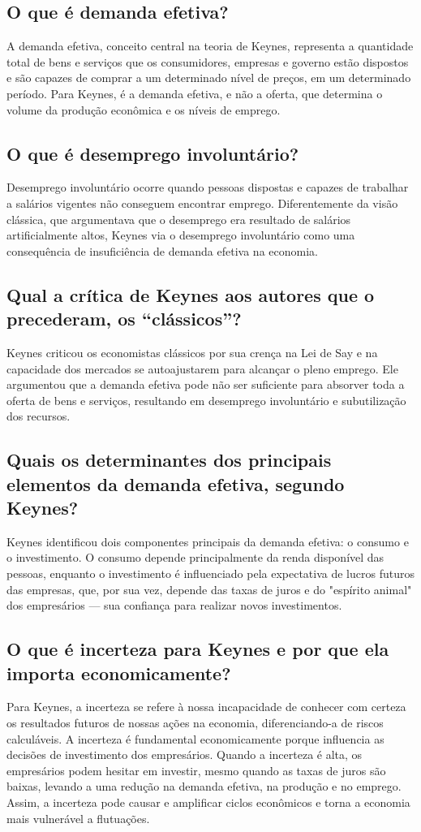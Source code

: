 \documentclass[a4paper,12pt]{article}[abntex2]
\begin{document}
\subsection{\textbf{O que é demanda efetiva?}}
A demanda efetiva, conceito central na teoria de Keynes, representa a quantidade total de bens e serviços que os consumidores, empresas e governo estão dispostos e são capazes de comprar a um determinado nível de preços, em um determinado período. Para Keynes, é a demanda efetiva, e não a oferta, que determina o volume da produção econômica e os níveis de emprego.
\subsection{\textbf{O que é desemprego involuntário?}}
Desemprego involuntário ocorre quando pessoas dispostas e capazes de trabalhar a salários vigentes não conseguem encontrar emprego. Diferentemente da visão clássica, que argumentava que o desemprego era resultado de salários artificialmente altos, Keynes via o desemprego involuntário como uma consequência de insuficiência de demanda efetiva na economia.
\subsection{\textbf{Qual a crítica de Keynes aos autores que o precederam, os “clássicos”?}}
Keynes criticou os economistas clássicos por sua crença na Lei de Say e na capacidade dos mercados se autoajustarem para alcançar o pleno emprego. Ele argumentou que a demanda efetiva pode não ser suficiente para absorver toda a oferta de bens e serviços, resultando em desemprego involuntário e subutilização dos recursos.
\subsection{\textbf{Quais os determinantes dos principais elementos da demanda efetiva, segundo Keynes?}}
Keynes identificou dois componentes principais da demanda efetiva: o consumo e o investimento. O consumo depende principalmente da renda disponível das pessoas, enquanto o investimento é influenciado pela expectativa de lucros futuros das empresas, que, por sua vez, depende das taxas de juros e do "espírito animal" dos empresários — sua confiança para realizar novos investimentos.
\subsection{\textbf{O que é incerteza para Keynes e por que ela importa economicamente?}}
 Para Keynes, a incerteza se refere à nossa incapacidade de conhecer com certeza os resultados futuros de nossas ações na economia, diferenciando-a de riscos calculáveis. A incerteza é fundamental economicamente porque influencia as decisões de investimento dos empresários. Quando a incerteza é alta, os empresários podem hesitar em investir, mesmo quando as taxas de juros são baixas, levando a uma redução na demanda efetiva, na produção e no emprego. Assim, a incerteza pode causar e amplificar ciclos econômicos e torna a economia mais vulnerável a flutuações.
\end{document}
